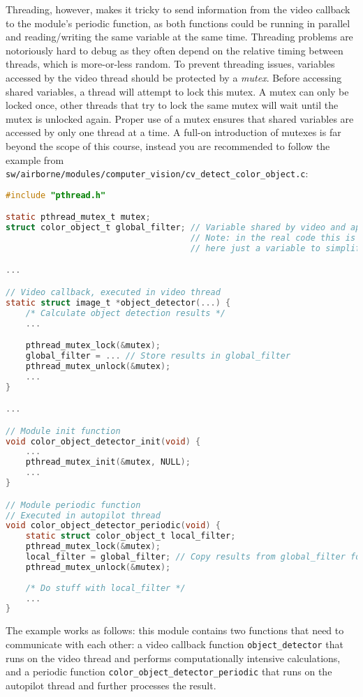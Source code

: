 \documentclass{article}
\begin{document}
Threading, however, makes it tricky to send information from the video callback to the module's periodic function, as both functions could be running in parallel and reading/writing the same variable at the same time. Threading problems are notoriously hard to debug as they often depend on the relative timing between threads, which is more-or-less random.
To prevent threading issues, variables accessed by the video thread should be protected by a \emph{mutex}. Before accessing shared variables, a thread will attempt to lock this mutex. A mutex can only be locked once, other threads that try to lock the same mutex will wait until the mutex is unlocked again. Proper use of a mutex ensures that shared variables are accessed by only one thread at a time.
A full-on introduction of mutexes is far beyond the scope of this course, instead you are recommended to follow the example from \texttt{sw/airborne/modules/computer\_vision/cv\_detect\_color\_object.c}:
\begin{lstlisting}[language=c]
#include "pthread.h"

static pthread_mutex_t mutex;
struct color_object_t global_filter; // Variable shared by video and ap thread
                                     // Note: in the real code this is an array,
                                     // here just a variable to simplify this example.

...

// Video callback, executed in video thread
static struct image_t *object_detector(...) {
	/* Calculate object detection results */
	...

	pthread_mutex_lock(&mutex);
	global_filter = ... // Store results in global_filter
	pthread_mutex_unlock(&mutex);
	...
}

...

// Module init function
void color_object_detector_init(void) {
	...
	pthread_mutex_init(&mutex, NULL);
	...
}

// Module periodic function
// Executed in autopilot thread
void color_object_detector_periodic(void) {
	static struct color_object_t local_filter;
	pthread_mutex_lock(&mutex);
	local_filter = global_filter; // Copy results from global_filter for processing
	pthread_mutex_unlock(&mutex);
	
	/* Do stuff with local_filter */
	...
}
\end{lstlisting}
The example works as follows: this module contains two functions that need to communicate with each other: a video callback function \texttt{object\_detector} that runs on the video thread and performs computationally intensive calculations, and a periodic function \texttt{color\_object\_detector\_periodic} that runs on the autopilot thread and further processes the result.
\end{document}
